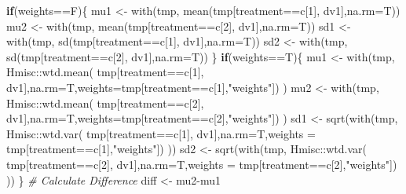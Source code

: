 \documentclass[
]{article}
\newenvironment{Shaded}{\begin{snugshade}}{\end{snugshade}}
\newcommand{\AttributeTok}[1]{\textcolor[rgb]{0.77,0.63,0.00}{#1}}
\newcommand{\CommentTok}[1]{\textcolor[rgb]{0.56,0.35,0.01}{\textit{#1}}}
\newcommand{\ControlFlowTok}[1]{\textcolor[rgb]{0.13,0.29,0.53}{\textbf{#1}}}
\newcommand{\DecValTok}[1]{\textcolor[rgb]{0.00,0.00,0.81}{#1}}
\newcommand{\FunctionTok}[1]{\textcolor[rgb]{0.00,0.00,0.00}{#1}}
\newcommand{\NormalTok}[1]{#1}
\newcommand{\OtherTok}[1]{\textcolor[rgb]{0.56,0.35,0.01}{#1}}
\newcommand{\SpecialCharTok}[1]{\textcolor[rgb]{0.00,0.00,0.00}{#1}}
\newcommand{\StringTok}[1]{\textcolor[rgb]{0.31,0.60,0.02}{#1}}
\begin{document}
\begin{Shaded}
\begin{Highlighting}[]
  \ControlFlowTok{if}\NormalTok{(weights}\SpecialCharTok{==}\NormalTok{F)\{}
\NormalTok{    mu1 }\OtherTok{\textless{}{-}} \FunctionTok{with}\NormalTok{(tmp, }\FunctionTok{mean}\NormalTok{(tmp[treatment}\SpecialCharTok{==}\NormalTok{c[}\DecValTok{1}\NormalTok{], dv1],}\AttributeTok{na.rm=}\NormalTok{T))}
\NormalTok{    mu2 }\OtherTok{\textless{}{-}} \FunctionTok{with}\NormalTok{(tmp, }\FunctionTok{mean}\NormalTok{(tmp[treatment}\SpecialCharTok{==}\NormalTok{c[}\DecValTok{2}\NormalTok{], dv1],}\AttributeTok{na.rm=}\NormalTok{T))}
\NormalTok{    sd1 }\OtherTok{\textless{}{-}} \FunctionTok{with}\NormalTok{(tmp, }\FunctionTok{sd}\NormalTok{(tmp[treatment}\SpecialCharTok{==}\NormalTok{c[}\DecValTok{1}\NormalTok{], dv1],}\AttributeTok{na.rm=}\NormalTok{T))}
\NormalTok{    sd2 }\OtherTok{\textless{}{-}} \FunctionTok{with}\NormalTok{(tmp, }\FunctionTok{sd}\NormalTok{(tmp[treatment}\SpecialCharTok{==}\NormalTok{c[}\DecValTok{2}\NormalTok{], dv1],}\AttributeTok{na.rm=}\NormalTok{T))}
\NormalTok{  \}}
  \ControlFlowTok{if}\NormalTok{(weights}\SpecialCharTok{==}\NormalTok{T)\{}
\NormalTok{    mu1 }\OtherTok{\textless{}{-}} \FunctionTok{with}\NormalTok{(tmp, Hmisc}\SpecialCharTok{::}\FunctionTok{wtd.mean}\NormalTok{(}
\NormalTok{      tmp[treatment}\SpecialCharTok{==}\NormalTok{c[}\DecValTok{1}\NormalTok{], dv1],}\AttributeTok{na.rm=}\NormalTok{T,}\AttributeTok{weights=}\NormalTok{tmp[treatment}\SpecialCharTok{==}\NormalTok{c[}\DecValTok{1}\NormalTok{],}\StringTok{"weights"}\NormalTok{])}
\NormalTok{      )}
\NormalTok{    mu2 }\OtherTok{\textless{}{-}} \FunctionTok{with}\NormalTok{(tmp, Hmisc}\SpecialCharTok{::}\FunctionTok{wtd.mean}\NormalTok{(}
\NormalTok{      tmp[treatment}\SpecialCharTok{==}\NormalTok{c[}\DecValTok{2}\NormalTok{], dv1],}\AttributeTok{na.rm=}\NormalTok{T,}\AttributeTok{weights=}\NormalTok{tmp[treatment}\SpecialCharTok{==}\NormalTok{c[}\DecValTok{2}\NormalTok{],}\StringTok{"weights"}\NormalTok{])}
\NormalTok{      )}
\NormalTok{    sd1 }\OtherTok{\textless{}{-}} \FunctionTok{sqrt}\NormalTok{(}\FunctionTok{with}\NormalTok{(tmp, Hmisc}\SpecialCharTok{::}\FunctionTok{wtd.var}\NormalTok{(}
\NormalTok{      tmp[treatment}\SpecialCharTok{==}\NormalTok{c[}\DecValTok{1}\NormalTok{], dv1],}\AttributeTok{na.rm=}\NormalTok{T,}\AttributeTok{weights =}\NormalTok{ tmp[treatment}\SpecialCharTok{==}\NormalTok{c[}\DecValTok{1}\NormalTok{],}\StringTok{"weights"}\NormalTok{])}
\NormalTok{      ))}
\NormalTok{    sd2 }\OtherTok{\textless{}{-}} \FunctionTok{sqrt}\NormalTok{(}\FunctionTok{with}\NormalTok{(tmp, Hmisc}\SpecialCharTok{::}\FunctionTok{wtd.var}\NormalTok{(}
\NormalTok{      tmp[treatment}\SpecialCharTok{==}\NormalTok{c[}\DecValTok{2}\NormalTok{], dv1],}\AttributeTok{na.rm=}\NormalTok{T,}\AttributeTok{weights =}\NormalTok{ tmp[treatment}\SpecialCharTok{==}\NormalTok{c[}\DecValTok{2}\NormalTok{],}\StringTok{"weights"}\NormalTok{])}
\NormalTok{      ))}
\NormalTok{  \}}
  \CommentTok{\# Calculate Difference}
\NormalTok{  diff }\OtherTok{\textless{}{-}}\NormalTok{ mu2}\SpecialCharTok{{-}}\NormalTok{mu1}
  

\end{Highlighting}
\end{Shaded}
\end{document}
